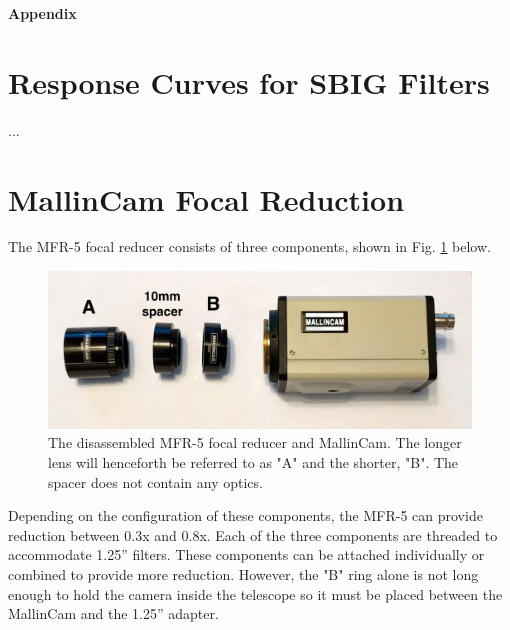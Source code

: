 \documentclass[12pt,titlepage]{article}
\begin{document}
\newpage
\begin{flushleft}
\textbf{\Large Appendix}
\end{flushleft}
\begin{appendix}

\setcounter{table}{0}   %
\renewcommand{\thetable}{\thesection\arabic{table}}  %
\setcounter{figure}{0}     %
\renewcommand{\thefigure}{\thesection\arabic{figure}}    %


\section{Response Curves for SBIG Filters}
...
\section{MallinCam Focal Reduction}
\label{sssec:focal_reduction}
\par The MFR-5 focal reducer consists of three components, shown in Fig. \ref{mfr5} below.
\begin{figure}[H] 
	\begin{center}
		\includegraphics[width=.8\textwidth]{./images/mallincam/focal_reduction/MFR5_labeled.jpg} 
		\caption{The disassembled MFR-5 focal reducer and MallinCam.
				The longer lens will henceforth be referred to as "A" and the shorter, "B".
				The spacer does not contain any optics.}
		\label{mfr5}
	\end{center}
\end{figure}
\noindent Depending on the configuration of these components, the MFR-5 can provide reduction between 0.3x and 0.8x.
Each of the three components are threaded to accommodate 1.25'' filters.
These components can be attached individually or combined to provide more reduction.
However, the "B" ring alone is not long enough to hold the camera inside the telescope so it must be placed between the MallinCam
and the 1.25'' adapter.
\begin{figure}[H] 

\end{figure}
\end{appendix}
\end{document}
